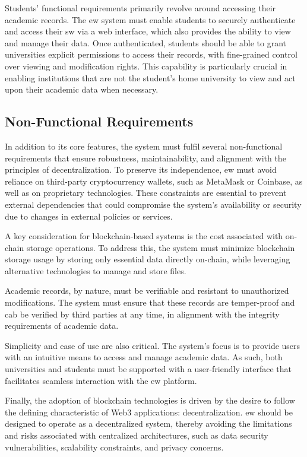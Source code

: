 Students' functional requirements primarily revolve around accessing their academic records. The \acrshort{ew} system must enable students to securely authenticate and access their \acrshort{sw} via a web interface, which also provides the ability to view and manage their data. Once authenticated, students should be able to grant universities explicit permissions to access their records, with fine-grained control over viewing and modification rights. This capability is particularly crucial in enabling institutions that are not the student's home university to view and act upon their academic data when necessary.

\subsection{Non-Functional Requirements}
In addition to its core features, the system must fulfil several non-functional requirements that ensure robustness, maintainability, and alignment with the principles of decentralization. To preserve its independence, \acrshort{ew} must avoid reliance on third-party cryptocurrency wallets, such as MetaMask or Coinbase, as well as on proprietary technologies. These constraints are essential to prevent external dependencies that could compromise the system’s availability or security due to changes in external policies or services.

A key consideration for blockchain-based systems is the cost associated with on-chain storage operations. To address this, the system must minimize blockchain storage usage by storing only essential data directly on-chain, while leveraging alternative technologies to manage and store files.

Academic records, by nature, must be verifiable and resistant to unauthorized modifications. The system must ensure that these records are temper-proof and cab be verified by third parties at any time, in alignment with the integrity requirements of academic data.

Simplicity and ease of use are also critical. The system's focus is to provide users with an intuitive means to access and manage academic data. As such, both universities and students must be supported with a user-friendly interface that facilitates seamless interaction with the \acrshort{ew} platform.

Finally, the adoption of blockchain technologies is driven by the desire to follow the defining characteristic of Web3 applications: decentralization. \acrshort{ew} should be designed to operate as a decentralized system, thereby avoiding the limitations and risks associated with centralized architectures, such as data security vulnerabilities, scalability constraints, and privacy concerns.